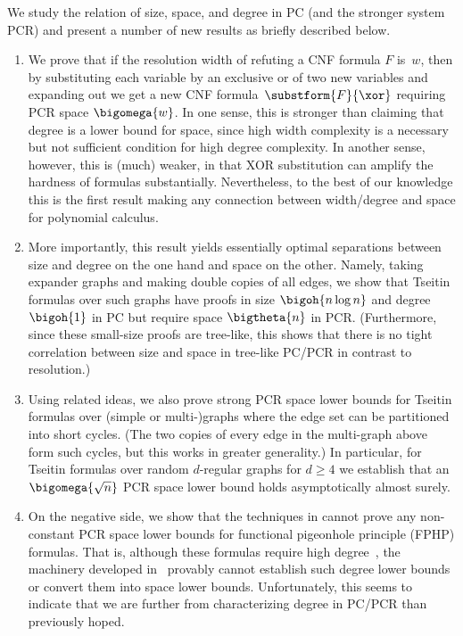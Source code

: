 \documentclass[11pt]{article}
\numberwithin{equation}{section}
\theoremstyle{definition}
\theoremstyle{plain}
\begin{document}
We study the relation of size, space, and degree in PC (and the 
stronger system PCR) and present
a number of new results as 
briefly described below.
%
\begin{enumerate}
  \item We prove that if the resolution width of refuting a CNF
  formula $F$ is~$w$, then by substituting each variable by an
  exclusive or of two new variables and expanding out we get a new CNF
  formula~$\substform{F}{\xor}$ requiring PCR space $\bigomega{w}$.
  In one sense, this is stronger than claiming that degree is a lower
  bound for space, since high width complexity is a necessary but not
  sufficient condition for high degree complexity. In another sense,
  however, this is (much) weaker, in that XOR substitution can amplify
  the hardness of formulas substantially. Nevertheless, to the best of
  our knowledge this is the first result making any connection between
  width/degree and space for polynomial calculus.%

\item
  More importantly, this result yields essentially optimal
  separations between size and degree on the one hand and space on
  the other. Namely, taking expander graphs and making
  double copies of all edges, we show that Tseitin formulas
  over such graphs
  have proofs in size $\bigoh{n \log n }$ and
  \mbox{degree $\bigoh{1}$} in PC but require
  space $\bigtheta{n}$ in PCR.
  (Furthermore, since these small-size proofs are tree-like, this
  shows that there is no tight correlation between size and space in
  tree-like PC/PCR in contrast to
  resolution.)

\item
  Using related ideas, we also prove strong PCR space
  lower bounds for Tseitin formulas over 
  (simple or \mbox{multi-)graphs}
%
  where the edge set can be partitioned into %
  short  %
  cycles.
  (The two copies of every edge in the multi-graph above form such
  cycles, but this works in greater generality.)
  In particular, for Tseitin formulas over random $d$-regular graphs
  for $d \geq 4$ we establish that \mbox{an $\bigomega{\sqrt{n}}$} PCR
  space lower bound holds asymptotically almost surely.%

\item
  On the negative side, we show that the
  techniques in
  \cite{BG15Framework}
  cannot prove any non-constant PCR space lower bounds for
  functional pigeonhole principle (FPHP) formulas.
  That is, although these formulas require high 
  degree~\cite{MN15GeneralizedMethodDegree},
  the machinery developed in~\cite{BG15Framework}
  provably cannot establish such degree lower bounds or convert them
  into space lower bounds.
  Unfortunately, this seems to indicate that we are further from
  characterizing degree in PC/PCR than previously hoped.
\end{enumerate}
\end{document}
